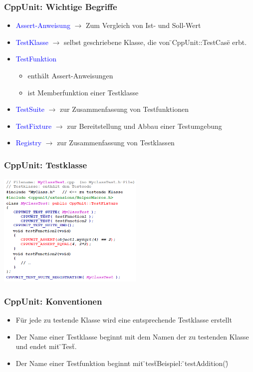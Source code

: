 \begin{multicols}{2}
\subsubsection{CppUnit: Wichtige Begriffe}
\begin{minipage}{8cm}
	\footnotesize{
	\begin{itemize}
		\item \textcolor{blue}{Assert-Anweisung} \newline $\rightarrow$ Zum Vergleich von Ist- und Soll-Wert
		\item \textcolor{blue}{TestKlasse} \newline $\rightarrow$ selbst geschriebene Klasse, die von \"{}CppUnit::TestCase\"{} erbt.
		\item \textcolor{blue}{TestFunktion} \begin{itemize}
			\item enthält Assert-Anweisungen
			\item ist Memberfunktion einer Testklasse
		\end{itemize}
		\item \textcolor{blue}{TestSuite} \newline $\rightarrow$ zur Zusammenfassung von Testfunktionen
		\item \textcolor{blue}{TestFixture} \newline $\rightarrow$ zur Bereitstellung und Abbau einer Testumgebung
		\item \textcolor{blue}{Registry} \newline $\rightarrow$ zur Zusammenfassung von Testklassen
	\end{itemize}}
\end{minipage}
\subsubsection{CppUnit: Testklasse}
\includegraphics[width = 7cm]{images/testklasse}
\subsubsection{CppUnit: Konventionen}
\begin{itemize}
	\item Für jede zu testende Klasse wird eine entsprechende Testklasse erstellt
	\item Der Name einer Testklasse beginnt mit dem Namen der zu testenden Klasse und endet mit \"{}Test\"{}.
	\item Der Name einer Testfunktion beginnt mit \"{}test\"{}\newline Beispiel: \"{}testAddition()\"{}
\end{itemize} 

\end{multicols}
